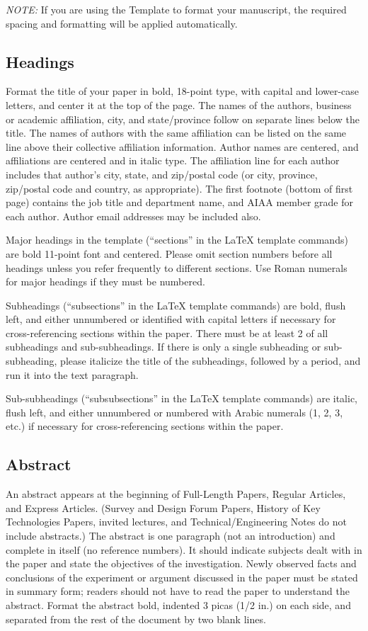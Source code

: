 \documentclass[journal ]{new-aiaa}
\begin{document}
\emph{NOTE:} If you are using the Template to format your manuscript, the required spacing and formatting will be applied automatically.


\subsection{Headings}
Format the title of your paper in bold, 18-point type, with capital and lower-case letters, and center it at the top of the page. The names of the authors, business or academic affiliation, city, and state/province follow on separate lines below the title. The names of authors with the same affiliation can be listed on the same line above their collective affiliation information. Author names are centered, and affiliations are centered and in italic type. The affiliation line for each author includes that author’s city, state, and zip/postal code (or city, province, zip/postal code and country, as appropriate). The first footnote (bottom of first page) contains the job title and department name, and AIAA member grade for each author. Author email addresses may be included also.

Major headings in the template (``sections'' in the \LaTeX{} template commands) are bold 11-point font and centered. Please omit section numbers before all headings unless you refer frequently to different sections. Use Roman numerals for major headings if they must be numbered.

Subheadings (``subsections'' in the \LaTeX{} template commands) are bold, flush left, and either unnumbered or identified with capital letters if necessary for cross-referencing sections within the paper. There must be at least 2 of all subheadings and sub-subheadings. If there is only a single subheading or sub-subheading, please italicize the title of the subheadings, followed by a period, and run it into the text paragraph. 

Sub-subheadings (``subsubsections'' in the \LaTeX{} template commands) are italic, flush left, and either unnumbered or numbered with Arabic numerals (1, 2, 3, etc.) if necessary for cross-referencing sections within the paper.


\subsection{Abstract}
An abstract appears at the beginning of Full-Length Papers, Regular Articles, and Express Articles. (Survey and Design Forum Papers, History of Key Technologies Papers, invited lectures, and Technical/Engineering Notes do not include abstracts.) The abstract is one paragraph (not an introduction) and complete in itself (no reference numbers). It should indicate subjects dealt with in the paper and state the objectives of the investigation. Newly observed facts and conclusions of the experiment or argument discussed in the paper must be stated in summary form; readers should not have to read the paper to understand the abstract. Format the abstract bold, indented 3 picas (1/2 in.) on each side, and separated from the rest of the document by two blank lines.
\end{document}
